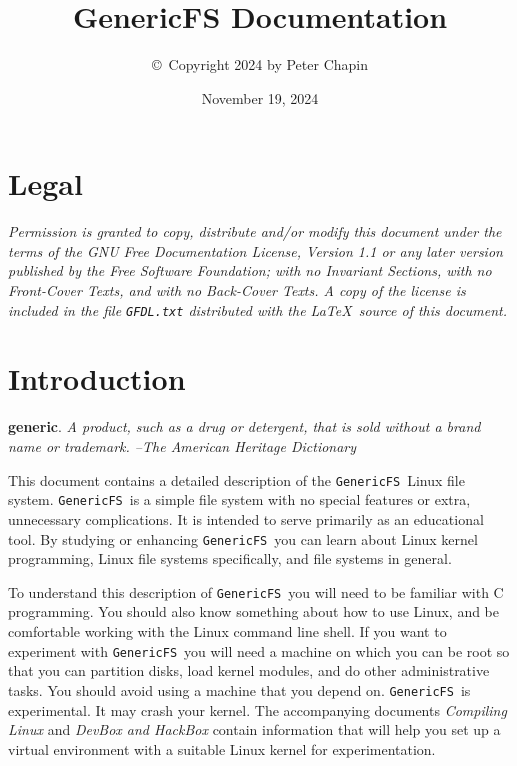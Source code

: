\documentclass[twocolumn]{article}
\newcommand{\GenericFS}{\texttt{GenericFS}}
\begin{document}
\title{GenericFS Documentation}
\author{\copyright\ Copyright 2024 by Peter Chapin}
\date{November 19, 2024}
\maketitle

\tableofcontents

\section*{Legal}
\label{sec:legal}

\textit{Permission is granted to copy, distribute and/or modify this document under the terms of
the GNU Free Documentation License, Version 1.1 or any later version published by the Free
Software Foundation; with no Invariant Sections, with no Front-Cover Texts, and with no
Back-Cover Texts. A copy of the license is included in the file \texttt{GFDL.txt} distributed
with the \LaTeX\ source of this document.}

\section{Introduction}
\label{sec:intro}

\textbf{generic}. \textit{A product, such as a drug or detergent, that is sold without a brand
name or trademark. --The American Heritage Dictionary}

This document contains a detailed description of the \GenericFS\ Linux file system. \GenericFS\
is a simple file system with no special features or extra, unnecessary complications. It is
intended to serve primarily as an educational tool. By studying or enhancing \GenericFS\ you can
learn about Linux kernel programming, Linux file systems specifically, and file systems in
general.

To understand this description of \GenericFS\ you will need to be familiar with C programming.
You should also know something about how to use Linux, and be comfortable working with the Linux
command line shell. If you want to experiment with \GenericFS\ you will need a machine on which
you can be root so that you can partition disks, load kernel modules, and do other
administrative tasks. You should avoid using a machine that you depend on. \GenericFS\ is
experimental. It may crash your kernel. The accompanying documents \textit{Compiling Linux} and
\textit{DevBox and HackBox} contain information that will help you set up a virtual environment
with a suitable Linux kernel for experimentation.








\end{document}
